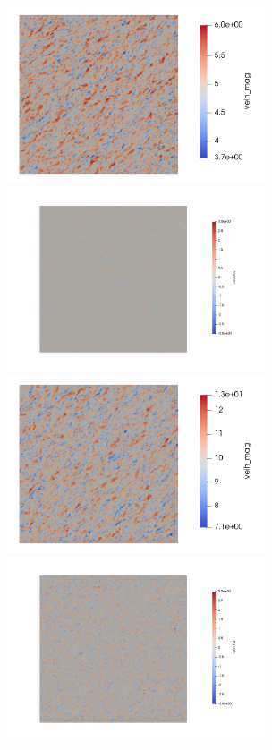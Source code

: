 \begin{figure}[hbt!]
  \centering
  \includegraphics[width=3.0in]{figures/snapshots/05ms/velh_mag_z20.png}
  \includegraphics[width=3.0in]{figures/snapshots/05ms/velz_z20_samelimits.png} \\

  \includegraphics[width=3.0in]{figures/snapshots/10ms/velh_mag_z20.png}
  \includegraphics[width=3.0in]{figures/snapshots/10ms/velz_z20_samelimits.png} \\


\end{figure}

